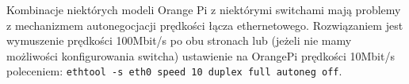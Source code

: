 Kombinacje niektórych modeli Orange Pi z niektórymi switchami mają problemy z mechanizmem autonegocjacji prędkości łącza ethernetowego.
Rozwiązaniem jest wymuszenie prędkości 100Mbit/s po obu stronach lub (jeżeli nie mamy możliwości konfigurowania switcha) ustawienie na OrangePi prędkości 10Mbit/s poleceniem: \Verb$ethtool -s eth0 speed 10 duplex full autoneg off$.

\ifdefined\useExternalSection
	\let\useExternalSection\undefined
\else
	\let\mysection\undefined
\fi

